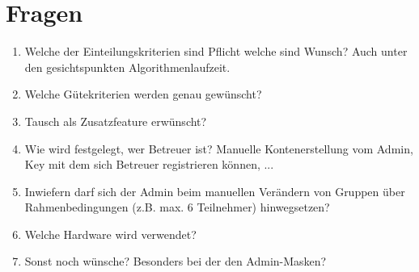 \documentclass[parskip=full]{scrartcl}
\begin{document}
\section{Fragen}
\begin{enumerate}
  \item Welche der Einteilungskriterien sind Pflicht welche sind Wunsch? Auch
  unter den gesichtspunkten Algorithmenlaufzeit.
  
  \item Welche Gütekriterien werden genau gewünscht?
  \item Tausch als Zusatzfeature erwünscht?
  \item Wie wird festgelegt, wer Betreuer ist? Manuelle Kontenerstellung vom Admin, Key mit dem sich Betreuer registrieren können, ...
  \item Inwiefern darf sich der Admin beim manuellen Verändern von Gruppen über Rahmenbedingungen (z.B. max. 6 Teilnehmer) hinwegsetzen?
  \item Welche Hardware wird verwendet?
  
  
  
  \item Sonst noch wünsche? Besonders bei der den Admin-Masken?
\end{enumerate}
\end{document}
